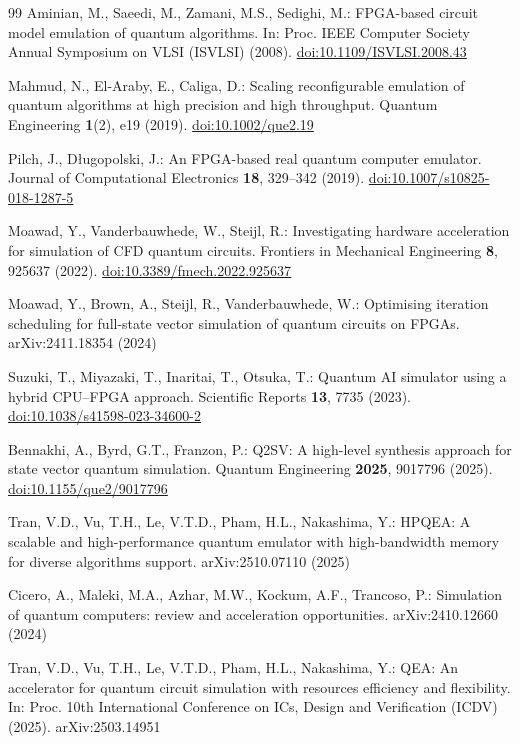 \documentclass[pdflatex,sn-mathphys-num]{sn-jnl}
\providecommand{\doi}[1]{\href{https://doi.org/#1}{doi:#1}}
\theoremstyle{thmstyleone}
\theoremstyle{thmstylethree}
\begin{document}
\begin{thebibliography}{99}
Aminian, M., Saeedi, M., Zamani, M.S., Sedighi, M.: FPGA-based circuit model emulation of quantum algorithms. In: Proc. IEEE Computer Society Annual Symposium on VLSI (ISVLSI) (2008). \doi{10.1109/ISVLSI.2008.43}

Mahmud, N., El-Araby, E., Caliga, D.: Scaling reconfigurable emulation of quantum algorithms at high precision and high throughput. Quantum Engineering \textbf{1}(2), e19 (2019). \doi{10.1002/que2.19}

Pilch, J., D{\l}ugopolski, J.: An FPGA-based real quantum computer emulator. Journal of Computational Electronics \textbf{18}, 329--342 (2019). \doi{10.1007/s10825-018-1287-5}

Moawad, Y., Vanderbauwhede, W., Steijl, R.: Investigating hardware acceleration for simulation of CFD quantum circuits. Frontiers in Mechanical Engineering \textbf{8}, 925637 (2022). \doi{10.3389/fmech.2022.925637}

Moawad, Y., Brown, A., Steijl, R., Vanderbauwhede, W.: Optimising iteration scheduling for full-state vector simulation of quantum circuits on FPGAs. arXiv:2411.18354 (2024)

Suzuki, T., Miyazaki, T., Inaritai, T., Otsuka, T.: Quantum AI simulator using a hybrid CPU--FPGA approach. Scientific Reports \textbf{13}, 7735 (2023). \doi{10.1038/s41598-023-34600-2}

Bennakhi, A., Byrd, G.T., Franzon, P.: Q2SV: A high-level synthesis approach for state vector quantum simulation. Quantum Engineering \textbf{2025}, 9017796 (2025). \doi{10.1155/que2/9017796}

Tran, V.D., Vu, T.H., Le, V.T.D., Pham, H.L., Nakashima, Y.: HPQEA: A scalable and high-performance quantum emulator with high-bandwidth memory for diverse algorithms support. arXiv:2510.07110 (2025)

Cicero, A., Maleki, M.A., Azhar, M.W., Kockum, A.F., Trancoso, P.: Simulation of quantum computers: review and acceleration opportunities. arXiv:2410.12660 (2024)

Tran, V.D., Vu, T.H., Le, V.T.D., Pham, H.L., Nakashima, Y.: QEA: An accelerator for quantum circuit simulation with resources efficiency and flexibility. In: Proc. 10th International Conference on ICs, Design and Verification (ICDV) (2025). arXiv:2503.14951


\end{thebibliography}
\end{document}

